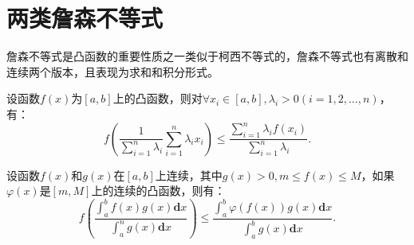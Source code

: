 \section{两类詹森不等式}

詹森不等式是凸函数的重要性质之一类似于柯西不等式的，詹森不等式也有离散和连续两个版本，且表现为求和和积分形式。
\begin{theorem}[离散的詹森不等式]
	设函数$f(x)$为$[a,b]$上的凸函数，则对$\forall x_i\in[a,b],\lambda_i>0(i=1,2,\dots,n)$，有：
	\begin{equation}
		f\left(\dfrac{1}{\displaystyle\sum_{i=1}^{n}\lambda_i}\displaystyle\sum_{i=1}^{n}\lambda_ix_i\right)\leq\dfrac{\displaystyle\sum_{i=1}^{n}\lambda_if(x_i)}{\displaystyle\sum_{i=1}^{n}\lambda_i}.
	\end{equation}
\end{theorem}
	
\begin{theorem}[连续的詹森不等式]
	设函数$f(x)$和$g(x)$在$[a,b]$上连续，其中$g(x)>0,m\leq f(x)\leq M$，如果$\varphi(x)$是$[m,M]$上的连续的凸函数，则有：
	\begin{equation}
		f\left(\dfrac{\int_{a}^{b}f(x)g(x)\textbf{d}x}{\int_{a}^{n}g(x)\textbf{d}x}\right)\leq\dfrac{\int_{a}^{b}\varphi(f(x))g(x)\textbf{d}x}{\int_{a}^{b}g(x)\textbf{d}x}.
	\end{equation}
\end{theorem}